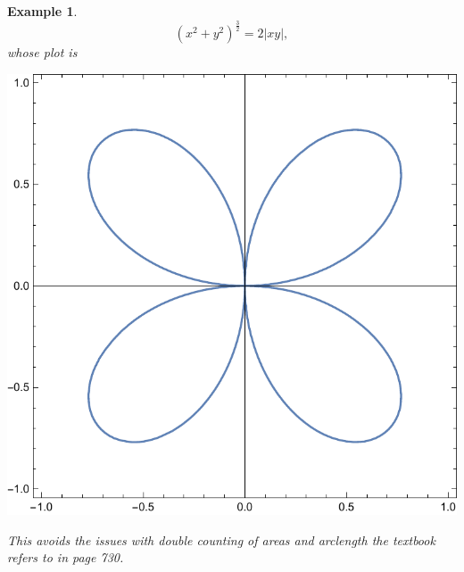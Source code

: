 \documentclass[11pt]{amsart}
\newtheorem{example}{Example}[section]
\numberwithin{equation}{section}
\begin{document}
\begin{example}
\begin{equation}
(x^2+y^2)^{\frac{3}{2}}  = 2|xy|,
\end{equation}
whose plot is 
\begin{center}
\includegraphics[scale=0.4]{polar_p7.pdf}
\end{center} 
This avoids the issues with double counting of areas and arclength the textbook refers to in page 730. 
\end{example}
\end{document}
